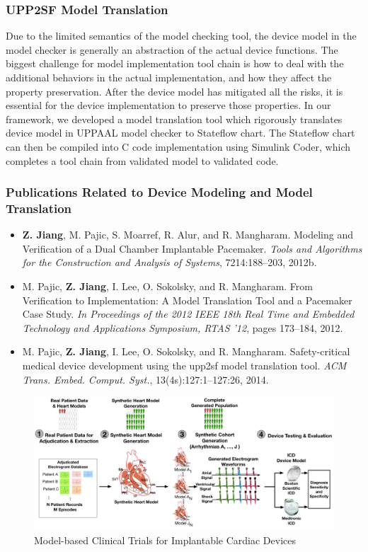 \documentclass[a4paper,11pt]{article}
\begin{document}
\subsubsection{UPP2SF Model Translation}
Due to the limited semantics of the model checking tool, the device model in the model checker is generally an abstraction of the actual device functions.
The biggest challenge for model implementation tool chain is how to deal with the additional behaviors in the actual implementation, and how they affect the property preservation.
After the device model has mitigated all the risks, it is essential for the device implementation to preserve those properties.
In our framework, we developed a model translation tool which rigorously translates device model in UPPAAL model checker to Stateflow chart.
The Stateflow chart can then be compiled into C code implementation using Simulink Coder, which completes a tool chain from validated model to validated code.

\subsubsection{Publications Related to Device Modeling and Model Translation}
\begin{itemize}
\item \textbf{Z. Jiang}, M. Pajic, S. Moarref, R. Alur, and R. Mangharam. Modeling and Verification of a Dual Chamber Implantable Pacemaker. \emph{Tools and Algorithms for the Construction and Analysis of Systems}, 7214:188–203, 2012b.
\item M. Pajic, \textbf{Z. Jiang}, I. Lee, O. Sokolsky, and R. Mangharam. From Verification to Implementation: A Model Translation Tool and a Pacemaker Case Study. \emph{In Proceedings of the 2012 IEEE 18th Real Time and Embedded Technology and Applications Symposium, RTAS ’12}, pages 173–184, 2012.
\item M. Pajic, \textbf{Z. Jiang}, I. Lee, O. Sokolsky, and R. Mangharam. Safety-critical medical device development using the upp2sf model translation tool. \emph{ACM Trans. Embed. Comput. Syst.}, 13(4s):127:1–127:26, 2014.
\end{itemize}


\begin{figure}[t]
	\centering
	\includegraphics[scale=0.25]{figs/figMBCToverview.pdf}
	\caption{\small Model-based Clinical Trials for Implantable Cardiac Devices}
	\label{fig:mbct}
\end{figure}
\end{document}
